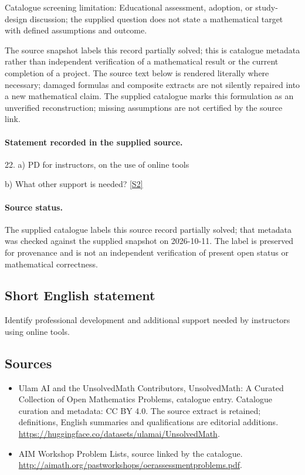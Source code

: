 \documentclass[11pt]{article}
\begin{document}
Catalogue screening limitation: Educational assessment, adoption, or study-design discussion; the supplied question does not state a mathematical target with defined assumptions and outcome.

The source snapshot labels this record partially solved; this is catalogue metadata rather than independent verification of a mathematical result or the current completion of a project.
The source text below is rendered literally where necessary; damaged formulas and composite extracts are not silently repaired into a new mathematical claim.
The supplied catalogue marks this formulation as an unverified reconstruction; missing assumptions are not certified by the source link.
\paragraph{Statement recorded in the supplied source.}
22. a) PD for instructors, on the use of online tools

b) What other support is needed? \href{http://aimath.org/pastworkshops/oerassessmentproblems.pdf}{[S2]}
\paragraph{Source status.}
The supplied catalogue labels this source record partially solved; that metadata was checked against the supplied snapshot on 2026-10-11. The label is preserved for provenance and is not an independent verification of present open status or mathematical correctness.
\subsection{Short English statement}
Identify professional development and additional support needed by instructors using online tools.
\subsection{Sources}
\begin{itemize}
\item[S1] Ulam AI and the UnsolvedMath Contributors, UnsolvedMath: A Curated Collection of Open Mathematics Problems, catalogue entry. Catalogue curation and metadata: CC BY 4.0. The source extract is retained; definitions, English summaries and qualifications are editorial additions.
\url{https://huggingface.co/datasets/ulamai/UnsolvedMath}.
\item[S2] AIM Workshop Problem Lists, source linked by the catalogue.
\url{http://aimath.org/pastworkshops/oerassessmentproblems.pdf}.
\end{itemize}
\end{document}
